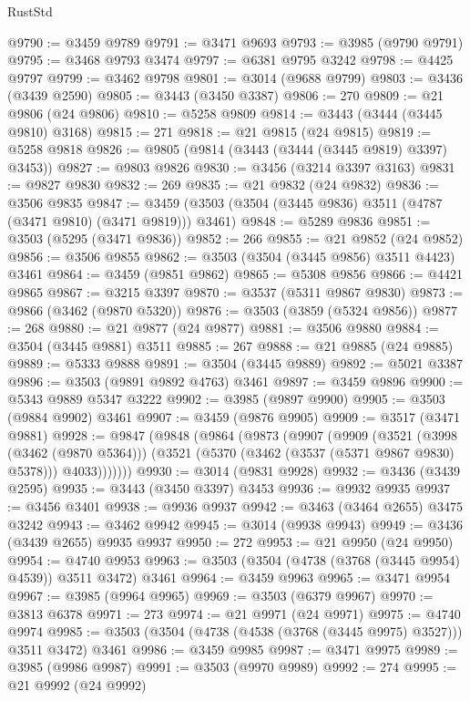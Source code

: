 \begin{lexlean}{RustStd}
\begin{coremodule}
@9790 := @3459 @9789
@9791 := @3471 @9693
@9793 := @3985 (@9790 @9791)
@9795 := @3468 @9793 @3474
@9797 := @6381 @9795 @3242
@9798 := @4425 @9797
@9799 := @3462 @9798
@9801 := @3014 (@9688 @9799)
@9803 := @3436 (@3439 @2590)
@9805 := @3443 (@3450 @3387)
@9806 := 270
@9809 := @21 @9806 (@24 @9806)
@9810 := @5258 @9809
@9814 := @3443 (@3444 (@3445 @9810) @3168)
@9815 := 271
@9818 := @21 @9815 (@24 @9815)
@9819 := @5258 @9818
@9826 := @9805 (@9814 (@3443 (@3444 (@3445 @9819) @3397) @3453))
@9827 := @9803 @9826
@9830 := @3456 (@3214 @3397 @3163)
@9831 := @9827 @9830
@9832 := 269
@9835 := @21 @9832 (@24 @9832)
@9836 := @3506 @9835
@9847 := @3459 (@3503 (@3504 (@3445 @9836) @3511 (@4787 (@3471 @9810) (@3471 @9819))) @3461)
@9848 := @5289 @9836
@9851 := @3503 (@5295 (@3471 @9836))
@9852 := 266
@9855 := @21 @9852 (@24 @9852)
@9856 := @3506 @9855
@9862 := @3503 (@3504 (@3445 @9856) @3511 @4423) @3461
@9864 := @3459 (@9851 @9862)
@9865 := @5308 @9856
@9866 := @4421 @9865
@9867 := @3215 @3397
@9870 := @3537 (@5311 @9867 @9830)
@9873 := @9866 (@3462 (@9870 @5320))
@9876 := @3503 (@3859 (@5324 @9856))
@9877 := 268
@9880 := @21 @9877 (@24 @9877)
@9881 := @3506 @9880
@9884 := @3504 (@3445 @9881) @3511
@9885 := 267
@9888 := @21 @9885 (@24 @9885)
@9889 := @5333 @9888
@9891 := @3504 (@3445 @9889)
@9892 := @5021 @3387
@9896 := @3503 (@9891 @9892 @4763) @3461
@9897 := @3459 @9896
@9900 := @5343 @9889 @5347 @3222
@9902 := @3985 (@9897 @9900)
@9905 := @3503 (@9884 @9902) @3461
@9907 := @3459 (@9876 @9905)
@9909 := @3517 (@3471 @9881)
@9928 := @9847
    (@9848
      (@9864
        (@9873
          (@9907
            (@9909
              (@3521
                (@3998 (@3462 (@9870 @5364)))
                (@3521 (@5370 (@3462 (@3537 (@5371 @9867 @9830) @5378))) @4033)))))))
@9930 := @3014 (@9831 @9928)
@9932 := @3436 (@3439 @2595)
@9935 := @3443 (@3450 @3397) @3453
@9936 := @9932 @9935
@9937 := @3456 @3401
@9938 := @9936 @9937
@9942 := @3463 (@3464 @2655) @3475 @3242
@9943 := @3462 @9942
@9945 := @3014 (@9938 @9943)
@9949 := @3436 (@3439 @2655) @9935 @9937
@9950 := 272
@9953 := @21 @9950 (@24 @9950)
@9954 := @4740 @9953
@9963 := @3503 (@3504 (@4738 (@3768 (@3445 @9954) @4539)) @3511 @3472) @3461
@9964 := @3459 @9963
@9965 := @3471 @9954
@9967 := @3985 (@9964 @9965)
@9969 := @3503 (@6379 @9967)
@9970 := @3813 @6378
@9971 := 273
@9974 := @21 @9971 (@24 @9971)
@9975 := @4740 @9974
@9985 := @3503 (@3504 (@4738 (@4538 (@3768 (@3445 @9975) @3527))) @3511 @3472) @3461
@9986 := @3459 @9985
@9987 := @3471 @9975
@9989 := @3985 (@9986 @9987)
@9991 := @3503 (@9970 @9989)
@9992 := 274
@9995 := @21 @9992 (@24 @9992)

\end{coremodule}
\end{lexlean}
